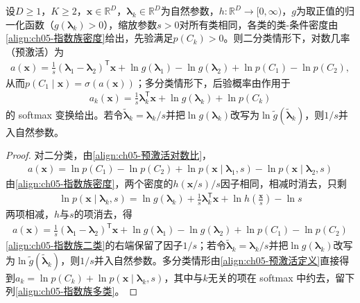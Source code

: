\documentclass[../../main.tex]{subfiles}
\begin{document}
\begin{proposition}\label{proposition:ch05-指数族后验}
设$D\geqslant1$，$K\geqslant2$，$\boldsymbol{x}\in\mathbb{R}^{D}$，$\boldsymbol{\lambda}_k\in\mathbb{R}^{D}$为自然参数，$h:\mathbb{R}^{D}\to[0,\infty)$，$g$为取正值的归一化函数（$g(\boldsymbol{\lambda}_k)>0$），缩放参数$s>0$对所有类相同，各类的类-条件密度由\eqref{align:ch05-指数族密度}给出，先验满足$p(C_k)>0$。则二分类情形下，对数几率（预激活）为
\begin{align}
  a(\boldsymbol{x})=\frac{1}{s}(\boldsymbol{\lambda}_1-\boldsymbol{\lambda}_2)^{\mathsf{T}}\boldsymbol{x}+\ln g(\boldsymbol{\lambda}_1)-\ln g(\boldsymbol{\lambda}_2)+\ln p(C_1)-\ln p(C_2),
  \label{align:ch05-指数族二类}
\end{align}
从而$p(C_1\mid\boldsymbol{x})=\sigma(a(\boldsymbol{x}))$；多分类情形下，后验概率由作用于
\begin{align}
  a_k(\boldsymbol{x})=\frac{1}{s}\boldsymbol{\lambda}_k^{\mathsf{T}}\boldsymbol{x}+\ln g(\boldsymbol{\lambda}_k)+\ln p(C_k)
  \label{align:ch05-指数族多类}
\end{align}
的 softmax 变换给出。若令$\tilde{\boldsymbol{\lambda}}_k=\boldsymbol{\lambda}_k/s$并把$\ln g(\boldsymbol{\lambda}_k)$改写为$\ln\tilde g(\tilde{\boldsymbol{\lambda}}_k)$，则$1/s$并入自然参数。
\end{proposition}

\begin{proof}
对二分类，由\eqref{align:ch05-预激活对数比}，
\begin{align}
  a(\boldsymbol{x})=\ln p(C_1)-\ln p(C_2)+\ln p(\boldsymbol{x}\mid\boldsymbol{\lambda}_1,s)-\ln p(\boldsymbol{x}\mid\boldsymbol{\lambda}_2,s)
\end{align}
由\eqref{align:ch05-指数族密度}，两个密度的$h(\boldsymbol{x}/s)/s$因子相同，相减时消去，只剩
\begin{align}
  \ln p(\boldsymbol{x}\mid\boldsymbol{\lambda}_k,s)=\ln g(\boldsymbol{\lambda}_k)+\frac{1}{s}\boldsymbol{\lambda}_k^{\mathsf{T}}\boldsymbol{x}+\ln h\left(\frac{\boldsymbol{x}}{s}\right)-\ln s
\end{align}
两项相减，$h$与$s$的项消去，得
\begin{align}
  a(\boldsymbol{x})=\frac{1}{s}(\boldsymbol{\lambda}_1-\boldsymbol{\lambda}_2)^{\mathsf{T}}\boldsymbol{x}+\ln g(\boldsymbol{\lambda}_1)-\ln g(\boldsymbol{\lambda}_2)+\ln p(C_1)-\ln p(C_2)
\end{align}
\eqref{align:ch05-指数族二类}的右端保留了因子$1/s$；若令$\tilde{\boldsymbol{\lambda}}_k=\boldsymbol{\lambda}_k/s$并把$\ln g(\boldsymbol{\lambda}_k)$改写为$\ln\tilde g(\tilde{\boldsymbol{\lambda}}_k)$，则$1/s$并入自然参数。多分类情形由\eqref{align:ch05-预激活定义}直接得到$a_k=\ln p(C_k)+\ln p(\boldsymbol{x}\mid\boldsymbol{\lambda}_k,s)$，其中与$k$无关的项在 softmax 中约去，留下列\eqref{align:ch05-指数族多类}。
\end{proof}
\end{document}
